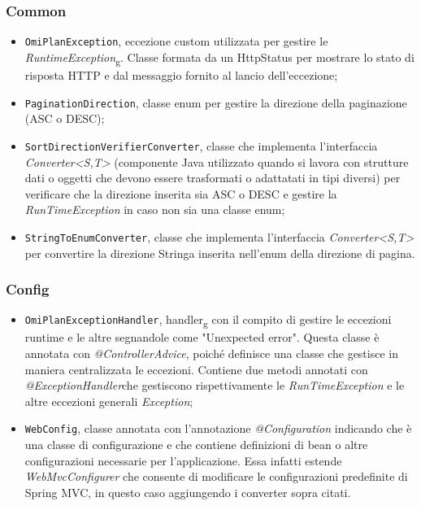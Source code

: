 \subsubsection*{Common}
\begin{itemize}
\item \texttt{OmiPlanException}, eccezione custom utilizzata per gestire le \textit{RuntimeException}\textsubscript{g}. Classe formata da un HttpStatus per mostrare lo stato di risposta HTTP e dal messaggio fornito al lancio dell'eccezione;
\item \texttt{PaginationDirection}, classe enum per gestire la direzione della paginazione (ASC o DESC);
\item \texttt{SortDirectionVerifierConverter}, classe che implementa l'interfaccia \textit{Converter<S,T>} (componente Java utilizzato quando si lavora con strutture dati o oggetti che devono essere trasformati o adattatati in tipi diversi) per verificare che la direzione inserita sia ASC o DESC e gestire la \textit{RunTimeException} in caso non sia una classe enum;
\item \texttt{StringToEnumConverter}, classe che implementa l'interfaccia \textit{Converter<S,T>} per convertire la direzione Stringa inserita nell'enum della direzione di pagina.
\end{itemize}

\subsubsection*{Config}
\begin{itemize}
\item \texttt{OmiPlanExceptionHandler}, handler\textsubscript{g} con il compito di gestire le eccezioni runtime e le altre segnandole come "Unexpected error". Questa classe è annotata con \textit{@ControllerAdvice}, poiché definisce una classe che gestisce in maniera centralizzata le eccezioni. Contiene due metodi annotati con \textit{@ExceptionHandler}che gestiscono rispettivamente le \textit{RunTimeException} e le altre eccezioni generali \textit{Exception};
\item \texttt{WebConfig}, classe annotata con l'annotazione \textit{@Configuration} indicando che è una classe di configurazione e che contiene definizioni di bean o altre configurazioni necessarie per l'applicazione. Essa infatti estende \textit{WebMvcConfigurer} che consente di modificare le configurazioni predefinite di Spring MVC, in questo caso aggiungendo i converter sopra citati.
\end{itemize}